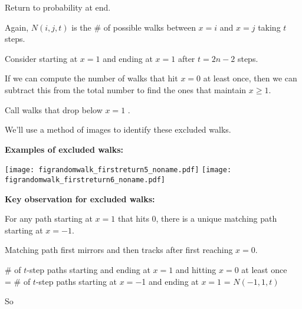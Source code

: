       Return to probability at end.
    
      Again,
      $N(i,j,t)$ is the \# of possible walks between $x=i$ and $x=j$ taking $t$ steps.
     
      Consider  starting at $x=1$ and ending at $x=1$ after $t=2n-2$ steps.
     
       If we can compute the number of walks that hit $x=0$ at least once, then we can
      subtract this from the total number to find the ones that maintain $x \ge 1$.
     
      Call walks that drop below $x=1$ .
     
      We'll use a method of images to identify these excluded walks.
    
  



  \textbf{Examples of excluded walks:}
    \begin{center}
      \texttt{[image: figrandomwalk\_firstreturn5\_noname.pdf]}
      \texttt{[image: figrandomwalk\_firstreturn6\_noname.pdf]}
    \end{center}
  

    \textbf{Key observation for excluded walks:}
      
        
        For any path starting at $x$$=$$1$ that hits 0,
        there is a unique matching path starting at $x$$=$$-1$.
         
        Matching path first mirrors and then tracks after first reaching $x$$=$$0$.
      
        \# of $t$-step paths starting and ending at $x$$=$$1$
        and hitting $x$$=$$0$ at least once\\
        {= \# of $t$-step paths starting at $x$$=$$-$1 and ending at $x$$=$$1$}
        {= $N(-1,1,t)$\\}
      
        So 
      
    




